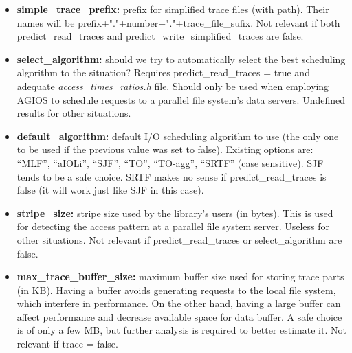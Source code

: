 \begin{itemize}
\item \textbf{simple\_trace\_prefix:} prefix for simplified trace files (with path). Their names will be prefix+"."+number+"."+trace\_file\_sufix. Not relevant if both predict\_read\_traces and predict\_write\_simplified\_traces are false.
\item \textbf{select\_algorithm:} should we try to automatically select the best scheduling algorithm to the situation? Requires predict\_read\_traces = true and adequate \emph{access\_times\_ratios.h} file. Should only be used when employing AGIOS to schedule requests to a parallel file system's data servers. Undefined results for other situations.
\item \textbf{default\_algorithm:} default I/O scheduling algorithm to use (the only one to be used if the previous value was set to false). Existing options are: ``MLF'', ``aIOLi'', ``SJF'', ``TO'', ``TO-agg'', ``SRTF'' (case sensitive). SJF tends to be a safe choice. SRTF makes no sense if predict\_read\_traces is false (it will work just like SJF in this case).
\item \textbf{stripe\_size:} stripe size used by the library's users (in bytes). This is used for detecting the access pattern at a parallel file system server. Useless for other situations. Not relevant if predict\_read\_traces or select\_algorithm are false.
\item \textbf{max\_trace\_buffer\_size:} maximum buffer size used for storing trace parts (in KB). Having a buffer avoids generating requests to the local file system, which interfere in performance. On the other hand, having a large buffer can affect performance and decrease available space for data buffer. A safe choice is of only a few MB, but further analysis is required to better estimate it. Not relevant if trace = false.
\end{itemize}
